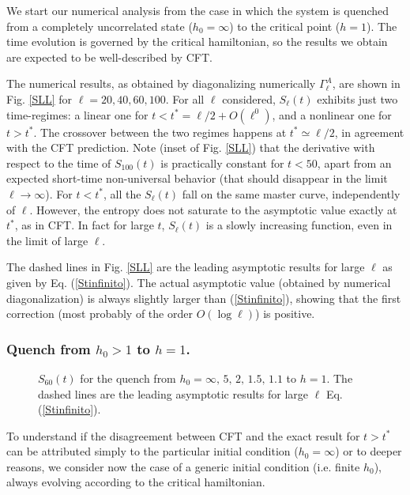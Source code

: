 We start our numerical analysis from the case in which the system is 
quenched from a completely uncorrelated state ($h_0=\infty$) to the critical 
point ($h=1$). 
The time evolution is governed by the critical hamiltonian, so
the results we obtain are expected to be well-described by CFT.

The numerical results, as obtained by diagonalizing numerically 
$\Gamma^A_\ell$, are shown in Fig. \ref{SLL} for $\ell=20,40,60,100$. 
For all $\ell$ considered, $S_\ell(t)$ exhibits just two time-regimes: 
a linear one for $t<t^*= \ell/2+O(\ell^0)$, and a nonlinear one for $t>t^*$.
The crossover between the two regimes happens 
at $t^*\simeq \ell/2$, in agreement with the CFT prediction. 
Note (inset of Fig. \ref{SLL}) that the derivative with respect to the 
time of $S_{100}(t)$ is practically constant for $t<50$, apart from an 
expected short-time non-universal behavior (that should disappear in the 
limit $\ell\rightarrow\infty$).
For $t<t^*$, all the $S_\ell(t)$ fall on the same master curve, 
independently of $\ell$.
However, the entropy does not saturate to the asymptotic value
exactly at $t^*$, as in CFT. 
In fact for large $t$, $S_\ell(t)$ is a slowly increasing function, even in 
the limit of large $\ell$. 

The dashed lines in Fig. \ref{SLL} are the leading asymptotic results for 
large $\ell$ as given by Eq. (\ref{Stinfinito}).
The actual asymptotic value (obtained by numerical diagonalization) is
always slightly larger than (\ref{Stinfinito}), showing that the first 
correction (most probably of the order $O(\log \ell)$) is positive.




\subsubsection{Quench from $h_0>1$ to $h=1$.}

\begin{figure}[t]
\centerline{}
\caption{$S_{60}(t)$ for the quench from 
$h_0=\infty,\,5,\,2,\,1.5,\,1.1$ to $h=1$.
The dashed lines are the leading asymptotic results for large $\ell$ 
Eq. (\ref{Stinfinito}).
}
\label{SLh0}
\end{figure}

To understand if the disagreement between CFT and the exact 
result for $t>t^*$ can be attributed simply to the particular initial 
condition ($h_0=\infty$) or to deeper reasons, we consider now the case of 
a generic initial condition (i.e. finite $h_0$), always evolving according to 
the critical hamiltonian.

